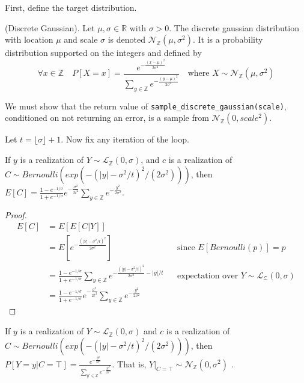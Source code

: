 \documentclass{article}
\begin{document}
First, define the target distribution.

\begin{definition}
    (Discrete Gaussian). Let $\mu, \sigma \in \mathbb{R}$ with $\sigma > 0$. 
    The discrete gaussian distribution with location $\mu$ and scale $\sigma$ is denoted $\mathcal{N}_\mathbb{Z}(\mu, \sigma^2)$. 
    It is a probability distribution supported on the integers and defined by \cite{CKS20}
\begin{equation*}
    \forall x \in \mathbb{Z} \quad  P[X = x] = \frac{e^{-\frac{(x - \mu)^2}{2\sigma^2}}}{\sum_{y\in\mathbb{Z}}e^{-\frac{(y - \mu)^2}{2\sigma^2}}} \quad \text{where } X \sim \mathcal{N}_\mathbb{Z}(\mu, \sigma^2)
\end{equation*}
\end{definition}


We must show that the return value of \texttt{sample\_discrete\_gaussian(scale)}, conditioned on not returning an error, is a sample from $\mathcal{N}_\mathbb{Z}(0, scale^2)$.

Let $t = \lfloor \sigma \rfloor + 1$. 
Now fix any iteration of the loop. 

\begin{lemma}
If $y$ is a realization of $Y \sim \mathcal{L}_\mathbb{Z}(0, \sigma)$, and $c$ is a realization of $C \sim Bernoulli(exp(-(|y| - \sigma^2 / t)^2 / (2 \sigma^2)))$, then
$E[C] = \frac{1 - e^{-1/\sigma}}{1 + e^{-1/\sigma}}e^{-\frac{\sigma^2}{2t^2}} \sum_{y\in \mathbb{Z}} e^{-\frac{y^2}{2\sigma^2}}$\cite{CKS20}.
\end{lemma}

\begin{proof}
\begin{align*}
    E[C] &= E[E[C|Y]] \\
    &= E[e^{-\frac{(|Y| - \sigma^2/t)^2}{2\sigma^2}}] && \text{since } E[Bernoulli(p)] = p \\
    &= \frac{1 - e^{-1/\sigma}}{1 + e^{-1/\sigma}} \sum_{y\in \mathbb{Z}} e^{-\frac{(|y| - \sigma^2/t)^2}{2\sigma^2} - |y|/t} && \text{expectation over } Y \sim \mathcal{L}_\mathcal{Z}(0, \sigma) \\
    &= \frac{1 - e^{-1/\sigma}}{1 + e^{-1/\sigma}}e^{-\frac{\sigma^2}{2t^2}} \sum_{y\in \mathbb{Z}} e^{-\frac{y^2}{2\sigma^2}}
\end{align*}
\end{proof}

\begin{theorem}
\label{P_Yy_CT} If $y$ is a realization of $Y \sim \mathcal{L}_\mathbb{Z}(0, \sigma)$ and $c$ is a realization of $C \sim Bernoulli(exp(-(|y| - \sigma^2 / t)^2 / (2 \sigma^2)))$, then
$P[Y=y | C=\top] = \frac{e^{-\frac{y^2}{2\sigma^2}}}{\sum_{y' \in \mathbb{Z}} e^{-\frac{y'^2}{2\sigma^2}}}$. That is, $Y|_{C=\top} \sim \mathcal{N}_\mathbb{Z}(0, \sigma^2)$ \cite{CKS20}.
\end{theorem}
\end{document}
